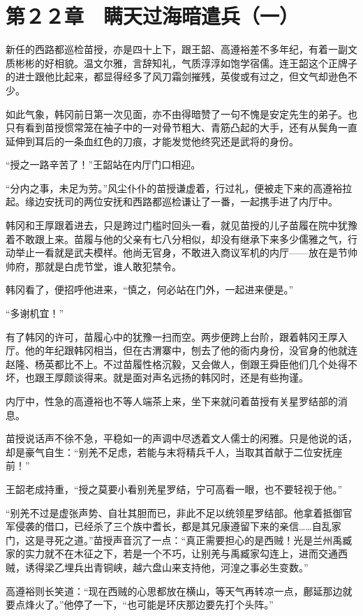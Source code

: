 \section{第２２章　瞒天过海暗遣兵（一）}

新任的西路都巡检苗授，亦是四十上下，跟王韶、高遵裕差不多年纪，有着一副文质彬彬的好相貌。温文尔雅，言辞知礼，气质淳淳如饱学宿儒。连王韶这个正牌子的进士跟他比起来，都显得经多了风刀霜剑摧残，英俊或有过之，但文气却逊色不少。

如此气象，韩冈前日第一次见面，亦不由得暗赞了一句不愧是安定先生的弟子。也只有看到苗授惯常笼在袖子中的一对骨节粗大、青筋凸起的大手，还有从鬓角一直延伸到耳后的一条血红色的刀痕，才能发觉他终究还是武将的身份。

“授之一路辛苦了！”王韶站在内厅门口相迎。

“分内之事，未足为劳。”风尘仆仆的苗授谦虚着，行过礼，便被走下来的高遵裕拉起。缘边安抚司的两位安抚和西路都巡检谦让了一番，一起携手进了内厅中。

韩冈和王厚跟着进去，只是跨过门槛时回头一看，就见苗授的儿子苗履在院中犹豫着不敢跟上来。苗履与他的父亲有七八分相似，却没有继承下来多少儒雅之气，行动举止一看就是武夫模样。他尚无官身，不敢进入商议军机的内厅——放在是节帅帅府，那就是白虎节堂，谁人敢犯禁令。

韩冈看了，便招呼他进来，“慎之，何必站在门外，一起进来便是。”

“多谢机宜！”

有了韩冈的许可，苗履心中的犹豫一扫而空。两步便跨上台阶，跟着韩冈王厚入厅。他的年纪跟韩冈相当，但在古渭寨中，刨去了他的衙内身份，没官身的他就连赵隆、杨英都比不上。不过苗履性格沉毅，又会做人，倒跟王舜臣他们几个处得不坏，也跟王厚颇谈得来。就是面对声名远扬的韩冈时，还是有些拘谨。

内厅中，性急的高遵裕也不等人端茶上来，坐下来就问着苗授有关星罗结部的消息。

苗授说话声不徐不急，平稳如一的声调中尽透着文人儒士的闲雅。只是他说的话，却是豪气自生：“别羌不足虑，若能与末将精兵千人，当取其首献于二位安抚座前！”

王韶老成持重，“授之莫要小看别羌星罗结，宁可高看一眼，也不要轻视于他。”

“别羌不过是虚张声势、自壮其胆而已，非此不足以统领星罗结部。他拿着抵御官军侵袭的借口，已经杀了三个族中耆长，都是其兄康遵留下来的亲信……自乱家门，这是寻死之道。”苗授声音沉了一点：“真正需要担心的是西贼！光是兰州禹臧家的实力就不在木征之下，若是一个不巧，让别羌与禹臧家勾连上，进而交通西贼，诱得梁乙埋兵出青铜峡，越六盘山来支持他，河湟之事必生变数。”

高遵裕则长笑道：“现在西贼的心思都放在横山，等天气再转凉一点，鄜延那边就要点烽火了。”他停了一下，“也可能是环庆那边要先打个头阵。”

